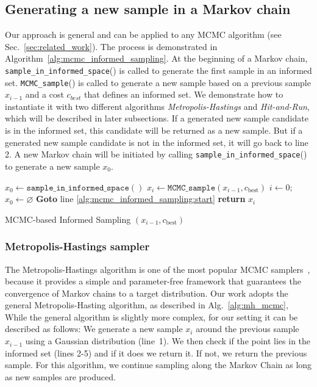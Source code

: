 \documentclass[letterpaper, 10 pt, conference]{ieeeconf}  %
\begin{document}
\subsection{Generating a new sample in a Markov chain}
\label{mcmc}

Our approach is general and can be applied to any MCMC algorithm (see Sec.~\ref{sec:related_work}).
The process is demonstrated in Algorithm~\ref{alg:mcmc_informed_sampling}.
At the beginning of a Markov chain, \texttt{sample\_in\_informed\_space}() is called to generate the first sample in an informed set.
\texttt{MCMC\_sample}() is called to generate a new sample based on a previous sample $ x_{i-1} $ and a cost $ c_{best} $ that defines an informed set.
We demonstrate how to instantiate it with two different algorithms \emph{Metropolis-Hastings} and \emph{Hit-and-Run}, which will be described in later subsections.
If a generated new sample candidate is in the informed set, this candidate will be returned as a new sample.
But if a generated new sample candidate is not in the informed set, it will go back to line 2.
A new Markov chain will be initiated by calling \texttt{sample\_in\_informed\_space}() to generate a new sample $ x_0 $.

\begin{algorithm}[t]
	\begin{algorithmic}[1]
		\LOOP 
		\label{alg:mcmc_informed_sampling:start}
			\STATE $x_{0} \leftarrow \texttt{sample\_in\_informed\_space}( )$
		\ENDIF
		\STATE $x_{i} \leftarrow \texttt{MCMC\_sample} (x_{i-1}, c_{\text{best}})$ 
			\STATE $ i \leftarrow 0 $; $ x_{0} \leftarrow \varnothing $
			\STATE \textbf{Goto} line \ref{alg:mcmc_informed_sampling:start} 
		\ENDIF
		\STATE \textbf{return} $x_{i}$
		\ENDLOOP 
	\end{algorithmic}
	\caption{MCMC-based Informed Sampling $( x_{i-1}, c_{\text{best}})$}
	\label{alg:mcmc_informed_sampling}	
\end{algorithm}


\subsubsection{Metropolis-Hastings sampler}


The Metropolis-Hastings algorithm is one of the most popular MCMC samplers~\cite{CG95}, because it provides a simple and parameter-free framework that guarantees the convergence of Markov chains to a target distribution.
Our work adopts the general Metropolis-Hasting algorithm, as described in Alg.~\ref{alg:mh_mcmc}, 
While the general algorithm is slightly more complex, for our setting it can be described as follows:
We generate a new sample $ x_{i}$ around the previous sample $ x_{i-1}$ using a Gaussian distribution (line~1).
We then check if the point lies in the informed set (lines 2-5) and if it does we return it.
If not, we return the previous sample.
%
For this algorithm, we continue sampling along the Markov Chain as long as new samples are produced.
\end{document}

